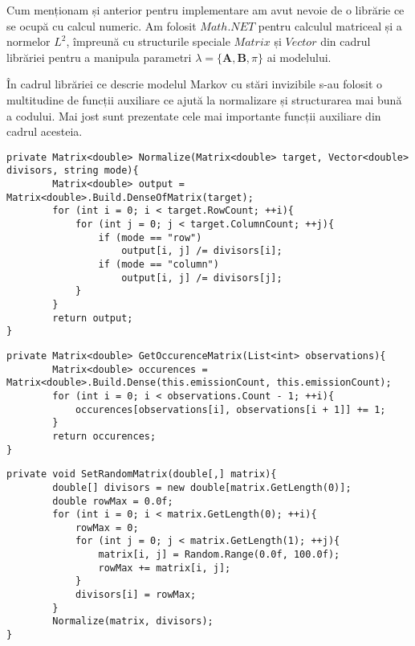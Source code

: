 Cum menționam și anterior pentru implementare am avut nevoie de o librărie ce se ocupă cu calcul numeric. Am folosit $Math.NET$ pentru calculul matriceal și a normelor $L^{2}$, împreună cu structurile speciale $Matrix$ și $Vector$ din cadrul librăriei pentru a manipula parametri $\lambda = \{\textbf{A},\textbf{B},\pi\}$ ai modelului.\par

În cadrul librăriei ce descrie modelul Markov cu stări invizibile s-au folosit o multitudine de funcții auxiliare ce ajută la normalizare și structurarea mai bună a codului. Mai jost sunt prezentate cele mai importante funcții auxiliare din cadrul acesteia.\par

\begin{lstlisting}[caption=Funcție auxiliara ce realizează normalizarea]
private Matrix<double> Normalize(Matrix<double> target, Vector<double> divisors, string mode){
        Matrix<double> output = Matrix<double>.Build.DenseOfMatrix(target);
        for (int i = 0; i < target.RowCount; ++i){
            for (int j = 0; j < target.ColumnCount; ++j){
                if (mode == "row")
                    output[i, j] /= divisors[i];
                if (mode == "column")
                    output[i, j] /= divisors[j];
            }
        }
        return output;
}
\end{lstlisting}


\begin{lstlisting}[caption=Funcție auxiliara ce construiește matricea de frecvență $C$]
private Matrix<double> GetOccurenceMatrix(List<int> observations){
        Matrix<double> occurences = Matrix<double>.Build.Dense(this.emissionCount, this.emissionCount);
        for (int i = 0; i < observations.Count - 1; ++i){
            occurences[observations[i], observations[i + 1]] += 1;
        }
        return occurences;
}
\end{lstlisting}

\begin{lstlisting}[caption=Funcție auxiliara ce contruieste o matrice cu intrări random]
private void SetRandomMatrix(double[,] matrix){
        double[] divisors = new double[matrix.GetLength(0)];
        double rowMax = 0.0f;
        for (int i = 0; i < matrix.GetLength(0); ++i){
            rowMax = 0;
            for (int j = 0; j < matrix.GetLength(1); ++j){
                matrix[i, j] = Random.Range(0.0f, 100.0f);
                rowMax += matrix[i, j];
            }
            divisors[i] = rowMax;
        }
        Normalize(matrix, divisors);
}
\end{lstlisting}
\clearpage

